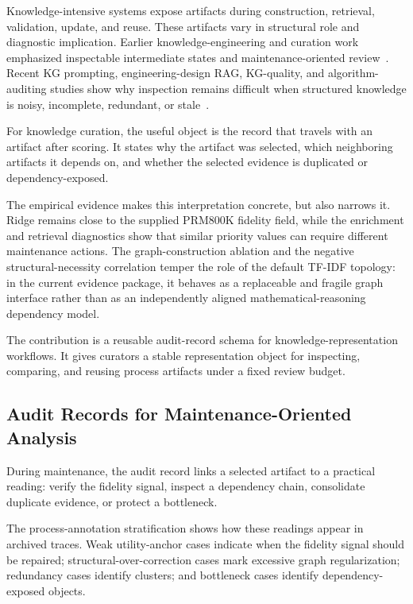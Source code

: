 \documentclass[a4paper,fleqn]{cas-sc}
\begin{document}
Knowledge-intensive systems expose artifacts during construction, retrieval, validation, update, and reuse. These artifacts vary in structural role and diagnostic implication. Earlier knowledge-engineering and curation work emphasized inspectable intermediate states and maintenance-oriented review~\cite{buchanan1984mycin,laird2012soar,studer1998knowledge,higgins2008dcc}. Recent KG prompting, engineering-design RAG, KG-quality, and algorithm-auditing studies show why inspection remains difficult when structured knowledge is noisy, incomplete, redundant, or stale~\cite{dai2025llmkg,siddharth2024retrieval,chen2025kgquality,dwivedi2021artificial,raji2020closing}.

For knowledge curation, the useful object is the record that travels with an artifact after scoring. It states why the artifact was selected, which neighboring artifacts it depends on, and whether the selected evidence is duplicated or dependency-exposed.

The empirical evidence makes this interpretation concrete, but also narrows it. Ridge remains close to the supplied PRM800K fidelity field, while the enrichment and retrieval diagnostics show that similar priority values can require different maintenance actions. The graph-construction ablation and the negative structural-necessity correlation temper the role of the default TF-IDF topology: in the current evidence package, it behaves as a replaceable and fragile graph interface rather than as an independently aligned mathematical-reasoning dependency model.

The contribution is a reusable audit-record schema for knowledge-representation workflows. It gives curators a stable representation object for inspecting, comparing, and reusing process artifacts under a fixed review budget.

\subsection{Audit Records for Maintenance-Oriented Analysis}
\label{sec:audit-interpretation}

During maintenance, the audit record links a selected artifact to a practical reading: verify the fidelity signal, inspect a dependency chain, consolidate duplicate evidence, or protect a bottleneck.

The process-annotation stratification shows how these readings appear in archived traces. Weak utility-anchor cases indicate when the fidelity signal should be repaired; structural-over-correction cases mark excessive graph regularization; redundancy cases identify clusters; and bottleneck cases identify dependency-exposed objects.
\end{document}
